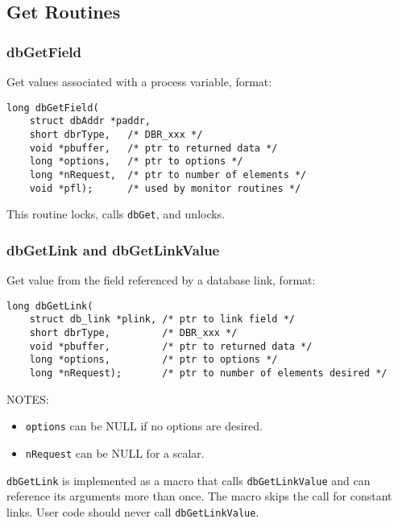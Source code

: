\subsection{Get Routines}

\subsubsection{dbGetField}

Get values associated with a process variable, format:

\begin{verbatim}
long dbGetField(
    struct dbAddr *paddr,
    short dbrType,   /* DBR_xxx */
    void *pbuffer,   /* ptr to returned data */
    long *options,   /* ptr to options */
    long *nRequest,  /* ptr to number of elements */
    void *pfl);      /* used by monitor routines */
\end{verbatim}

This routine locks, calls \verb|dbGet|, and unlocks.

\subsubsection{dbGetLink and dbGetLinkValue}

Get value from the field referenced by a database link, format:

\begin{verbatim}
long dbGetLink(
    struct db_link *plink, /* ptr to link field */
    short dbrType,         /* DBR_xxx */
    void *pbuffer,         /* ptr to returned data */
    long *options,         /* ptr to options */
    long *nRequest);       /* ptr to number of elements desired */
\end{verbatim}

NOTES:

\begin{itemize}

\item \verb|options| can be NULL if no options are desired.

\item \verb|nRequest| can be NULL for a scalar.

\end{itemize}

\verb|dbGetLink| is implemented as a macro that calls \verb|dbGetLinkValue| and can reference its arguments more than once. 
The macro skips the call for constant links. User code should never call \verb|dbGetLinkValue|.

